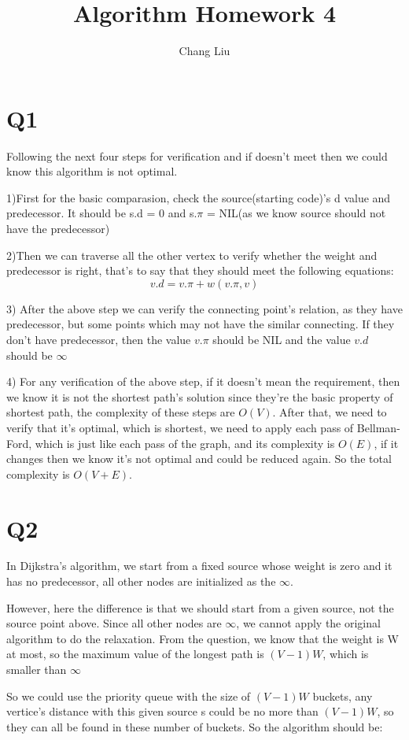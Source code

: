 \documentclass{article}
\title{Algorithm Homework 4}
\author{Chang Liu}
\begin{document}
\section{Q1}
Following the next four steps for verification and if doesn't meet then we could know this algorithm is not optimal.

1)First for the basic comparasion, check the source(starting code)'s d value and predecessor. It should be
s.d = 0 and s.$\pi$ = NIL(as we know source should not have the predecessor)

2)Then we can traverse all the other vertex to verify whether the weight and predecessor is right, that's to
say that they should meet the following equations:
$$v.d = v.\pi + w(v.\pi, v) $$

3) After the above step we can verify the connecting point's relation, as they have predecessor, but some points
which may not have the similar connecting. If they don't have predecessor, then the value $v.\pi$ should be NIL
and the value $v.d$ should be $\infty$


4) For any verification of the above step, if it doesn't mean the requirement, then we know it is not the shortest
path's solution since they're the basic property of shortest path, the complexity of these steps are $O(V)$. After
that, we need to verify that it's optimal, which is shortest, we need to apply each pass of Bellman-Ford, which is
just like each pass of the graph, and its complexity is $O(E)$, if it changes then we know it's not optimal and could
be reduced again. So the total complexity is $O(V+E)$.

\section{Q2}
In Dijkstra's algorithm, we start from a fixed source whose weight is zero and it has no predecessor, all other nodes
are initialized as the $\infty$.

However, here the difference is that we should start from a given source, not the source point above. Since all other
nodes are $\infty$, we cannot apply the original algorithm to do the relaxation. From the question, we know that the
weight is W at most, so the maximum value of the longest path is $(V-1)W$, which is smaller than $\infty$

So we could use the priority queue with the size of $(V-1)W$ buckets, any vertice's distance with this given source s
could be no more than $(V-1)W$, so they can all be found in these number of buckets. So the algorithm should be:
\end{document}

